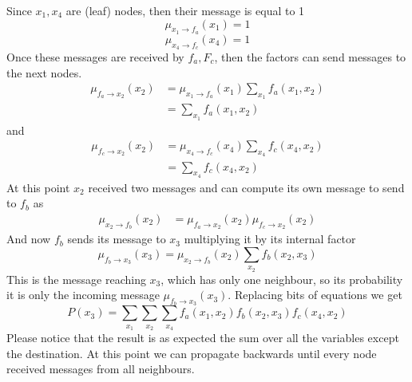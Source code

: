             Since $x_1, x_4$ are (leaf) nodes, then their message is equal to 1
            $$\mu_{x_1 \rightarrow f_a} (x_1) = 1$$
            $$\mu_{x_4 \rightarrow f_c} (x_4) = 1$$
            Once these messages are received by $f_a, F_c$, then the factors can send messages to the next nodes.
            \begin{align*}
                \mu_{f_a \rightarrow x_2} (x_2) &= \mu_{x_1 \rightarrow f_a} (x_1) \sum _{x_1} f_a(x_1, x_2) \\
                & = \sum _{x_1} f_a(x_1, x_2) 
            \end{align*}
            and
            \begin{align*}
                \mu_{f_c \rightarrow x_2} (x_2) &= \mu_{x_4 \rightarrow f_c} (x_4) \sum _{x_4} f_c(x_4, x_2) \\
                & = \sum _{x_4} f_c(x_4, x_2) 
            \end{align*}
            At this point $x_2$ received two messages and can compute its own message to send to $f_b$ as
            \begin{align*}
                \mu_{x_2 \rightarrow f_b} (x_2) &= \mu_{f_a \rightarrow x_2} (x_2) \mu_{f_c \rightarrow x_2} (x_2)
            \end{align*}
            And now $f_b$ sends its message to $x_3$ multiplying it by its internal factor
            $$\mu_{f_b \rightarrow x_3} (x_3) = \mu_{x_2 \rightarrow f_b} (x_2) \sum_{x_2} f_b (x_2, x_3)$$
            This is the message reaching $x_3$, which has only one neighbour, so its probability it is only the incoming message $\mu_{f_b \rightarrow x_3} (x_3)$. Replacing bits of equations we get
            $$P(x_3) = \sum _{x_1} \sum_{x_2} \sum_{x_4} f_a(x_1, x_2) f_b(x_2, x_3) f_c(x_4, x_2)$$
            Please notice that the result is as expected the sum over all the variables except the destination.
            At this point we can propagate backwards until every node received messages from all neighbours. 
        
